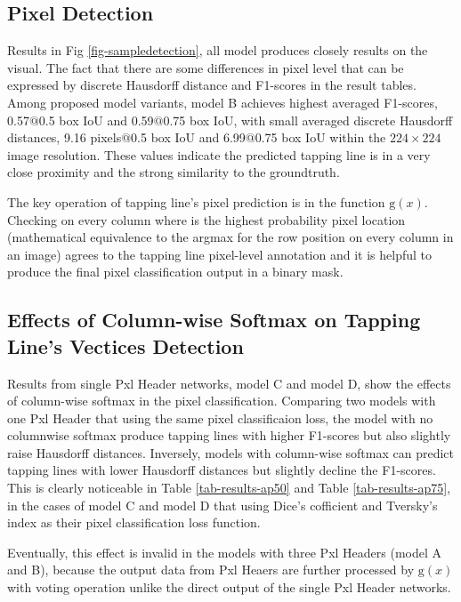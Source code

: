 \documentclass[default,pdflatex,iicol]{sn-jnl}%
\begin{document}
\subsection{Pixel Detection}
Results in Fig \ref{fig-sampledetection}, all model produces closely results on the visual. The fact that there are some differences in pixel level that can be expressed by discrete Hausdorff distance and F1-scores in the result tables. Among proposed model variants, model B achieves highest averaged F1-scores, 0.57$@$0.5 box IoU and 0.59$@$0.75 box IoU, with small averaged discrete Hausdorff distances, 9.16 pixels$@$0.5 box IoU and 6.99$@$0.75 box IoU within the $224 \times 224$ image resolution. These values indicate the predicted tapping line is in a very close proximity and the strong similarity to the groundtruth.

The key operation of tapping line's pixel prediction is in the function $\mathrm{g}(x)$. Checking on every column where is the highest probability pixel location (mathematical equivalence to the argmax for the row position on every column in an image) agrees to the tapping line pixel-level annotation and it is helpful to produce the final pixel classification output in a binary mask. 

\subsection{Effects of Column-wise Softmax on Tapping Line's Vectices Detection}
Results from single Pxl Header networks, model C and model D, show the effects of column-wise softmax in the pixel classification. Comparing two models with one Pxl Header that using the same pixel classificaion loss, the model with no columnwise softmax produce tapping lines with higher F1-scores but also slightly raise Hausdorff distances. Inversely, models with column-wise softmax can predict tapping lines with lower Hausdorff distances but slightly decline the F1-scores. This is clearly noticeable in Table \ref{tab-results-ap50} and Table \ref{tab-results-ap75}, in the cases of model C and model D that using Dice's cofficient and Tversky's index as their pixel classification loss function.

Eventually, this effect is invalid in the models with three Pxl Headers (model A and B), because the output data from Pxl Heaers are further processed by $\mathrm{g}(x)$ with voting operation unlike the direct output of the single Pxl Header networks.
\end{document}
